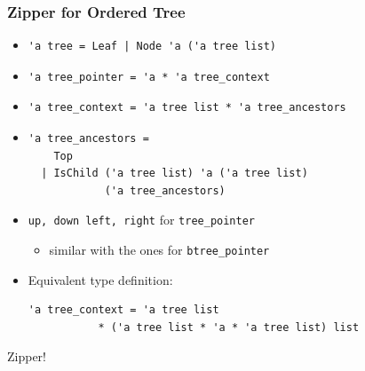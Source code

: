 \begin{frame}
\frametitle{Zipper for Ordered Tree}

\begin{itemize}
\item
\begin{lstlisting}
'a tree = Leaf | Node 'a ('a tree list)
\end{lstlisting}

\item
\begin{lstlisting}
'a tree_pointer = 'a * 'a tree_context
\end{lstlisting}

\item 
\begin{lstlisting}
'a tree_context = 'a tree list * 'a tree_ancestors
\end{lstlisting}

\item 
\begin{lstlisting}
'a tree_ancestors =
    Top
  | IsChild ('a tree list) 'a ('a tree list)
            ('a tree_ancestors)
\end{lstlisting}

\item \lstinline|up, down left, right| for \lstinline|tree_pointer|
\begin{itemize}
\item  similar with the ones for \lstinline|btree_pointer|
\end{itemize}

\item 
Equivalent type definition:\\
\begin{lstlisting}
'a tree_context = 'a tree list
           * ('a tree list * 'a * 'a tree list) list
\end{lstlisting}
\end{itemize}

\framebreak

Zipper!


\end{frame}
